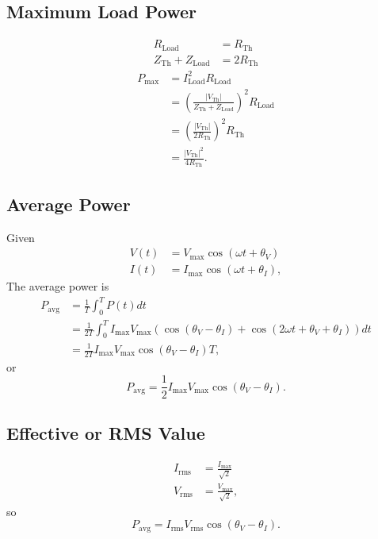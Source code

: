 \documentclass[letterpaper]{scrartcl}
\newcommand{\lr}[1]{\left(#1\right)}
\newcommand{\inv}[1]{\frac{1}{#1}}
\newcommand{\thev}[0]{\mathrm{Th}}
\newcommand{\load}[0]{\mathrm{Load}}
\newcommand{\Max}[0]{\mathrm{max}}
\newcommand{\Avg}[0]{\mathrm{avg}}
\newcommand{\rms}[0]{\mathrm{rms}}
\newcommand{\Abs}[1]{{\left\lvert{#1}\right\rvert}}
\begin{document}
\subsection*{Maximum Load Power}
\begin{equation}\label{eqn:karlCircuitsCheatSheet:540}
\begin{aligned}
R_\load &= R_\thev \\
Z_\thev + Z_\load &= 2 R_\thev
\end{aligned}
\end{equation}
\begin{equation}\label{eqn:karlCircuitsCheatSheet:560}
\begin{aligned}
P_\Max
&= I_\load^2 R_\load \\
&= \lr{ \frac{ \Abs{V_\thev} }{ Z_\thev + Z_\load } }^2 R_\load \\
&= \lr{ \frac{ \Abs{V_\thev} }{ 2 R_\thev} }^2 R_\thev \\
&= \frac{ \Abs{V_\thev}^2 }{ 4 R_\thev }.
\end{aligned}
\end{equation}

\subsection*{Average Power}
Given
\begin{equation}\label{eqn:karlCircuitsCheatSheet:580}
\begin{aligned}
V(t) &= V_\Max \cos\lr{ \omega t + \theta_V } \\
I(t) &= I_\Max \cos\lr{ \omega t + \theta_I },
\end{aligned}
\end{equation}
The average power is
\begin{equation}\label{eqn:karlCircuitsCheatSheet:600}
\begin{aligned}
P_\Avg
&= \inv{T} \int_0^T P(t) dt \\
&= \inv{2 T} \int_0^T I_\Max V_\Max \lr{ \cos\lr{\theta_V - \theta_I} + \cos\lr{ 2 \omega t + \theta_V + \theta_I } } dt \\
&= \inv{2 T} I_\Max V_\Max \cos\lr{\theta_V - \theta_I} T,
\end{aligned}
\end{equation}
or
\begin{equation}\label{eqn:karlCircuitsCheatSheet:620}
P_\Avg = \inv{2} I_\Max V_\Max \cos\lr{\theta_V - \theta_I}.
\end{equation}
\subsection*{Effective or RMS Value}
\begin{equation}\label{eqn:karlCircuitsCheatSheet:640}
\begin{aligned}
I_\rms &= \frac{I_\Max}{\sqrt{2}} \\
V_\rms &= \frac{V_\Max}{\sqrt{2}},
\end{aligned}
\end{equation}
so
\begin{equation}\label{eqn:karlCircuitsCheatSheet:660}
P_\Avg = I_\rms V_\rms \cos\lr{\theta_V - \theta_I}.
\end{equation}
\end{document}
